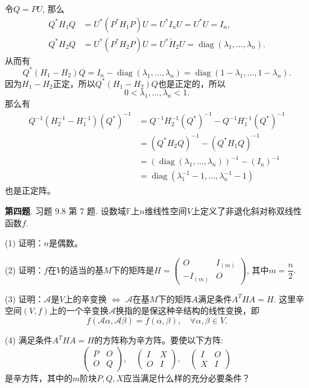 令$Q = PU$, 那么
\begin{align*}
Q^* H_1 Q & = U^* \left( P^* H_1 P \right) U = U^* I_n U = U^* U = I_n, \\
Q^* H_2 Q & = U^* \left( P^* H_2 P \right) U = U^* \widetilde{H}_2 U = \operatorname{diag} (\lambda_1, \ldots, \lambda_n).
\end{align*}
从而有
$$Q^* (H_1 - H_2) Q = I_n - \operatorname{diag} (\lambda_1, \ldots, \lambda_n) = \operatorname{diag} (1-\lambda_1, \ldots, 1-\lambda_n).$$
因为$H_1 - H_2$正定，所以$Q^* (H_1 - H_2) Q$也是正定的，所以
$$0 < \lambda_1, \ldots, \lambda_n < 1.$$
那么有
\begin{align*}
 Q^{-1} \left( H_2^{-1} - H_1^{-1} \right) \left( Q^* \right)^{-1} & = Q^{-1} H_2^{-1} \left( Q^* \right)^{-1} - Q^{-1} H_1^{-1} \left( Q^* \right)^{-1} \\
& = \left( Q^* H_2 Q \right)^{-1} - \left( Q^* H_1 Q \right)^{-1} \\
& = \left( \operatorname{diag} (\lambda_1, \ldots, \lambda_n) \right)^{-1} - \left( I_n \right)^{-1} \\
& = \operatorname{diag} (\lambda_1^{-1} - 1, \ldots, \lambda_n^{-1} - 1)
\end{align*}
也是正定阵。


\newpageorvspace


{\bf 第四题}. 习题 9.8 第 7 题. 设数域$\mathbb{F}$上$n$维线性空间$V$上定义了非退化斜对称双线性函数$f$.

(1) 证明：$n$是偶数。

(2) 证明：$f$在$V$的适当的基$M$下的矩阵是$H = \begin{pmatrix} O & I_{(m)} \\ -I_{(m)} & O \end{pmatrix}$, 其中$m = \dfrac{n}{2}$.

(3) 证明：$\mathcal{A}$是$V$上的辛变换 $\Leftrightarrow$ $\mathcal{A}$在基$M$下的矩阵$A$满足条件$A^THA = H$. 这里辛空间$(V, f)$上的一个辛变换$\mathcal{A}$换指的是保这种辛结构的线性变换，即
$$f(\mathcal{A} \alpha, \mathcal{A} \beta) = f(\alpha, \beta), \quad \forall \alpha, \beta \in V.$$

(4) 满足条件$A^THA = H$的方阵称为辛方阵。要使以下方阵:
$$
\begin{pmatrix} P & O \\ O & Q \end{pmatrix}, \quad
\begin{pmatrix} I & X \\ O & I \end{pmatrix}, \quad
\begin{pmatrix} I & O \\ X & I \end{pmatrix}
$$
是辛方阵，其中的$m$阶块$P, Q, X$应当满足什么样的充分必要条件？

